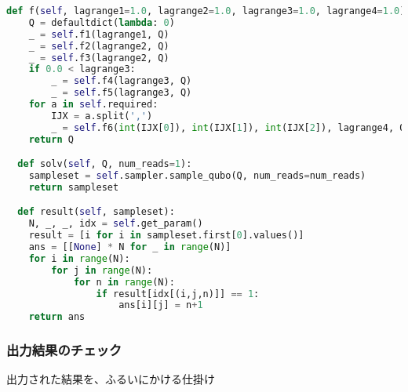 \documentclass[uplatex,dvipdfmx,a4paper,11pt,oneside,openany]{jsbook}
\begin{document}
\begin{lstlisting}[language=Python]
  def f(self, lagrange1=1.0, lagrange2=1.0, lagrange3=1.0, lagrange4=1.0):
    Q = defaultdict(lambda: 0)
    _ = self.f1(lagrange1, Q)
    _ = self.f2(lagrange2, Q)
    _ = self.f3(lagrange2, Q)
    if 0.0 < lagrange3:
        _ = self.f4(lagrange3, Q)
        _ = self.f5(lagrange3, Q)
    for a in self.required:
        IJX = a.split(',')
        _ = self.f6(int(IJX[0]), int(IJX[1]), int(IJX[2]), lagrange4, Q)
    return Q

  def solv(self, Q, num_reads=1):
    sampleset = self.sampler.sample_qubo(Q, num_reads=num_reads)
    return sampleset

  def result(self, sampleset):
    N, _, _, idx = self.get_param()
    result = [i for i in sampleset.first[0].values()]
    ans = [[None] * N for _ in range(N)]
    for i in range(N):
        for j in range(N):
            for n in range(N):
                if result[idx[(i,j,n)]] == 1:
                    ans[i][j] = n+1
    return ans
\end{lstlisting}

\subsubsection{出力結果のチェック}

出力された結果を、ふるいにかける仕掛け
\end{document}
